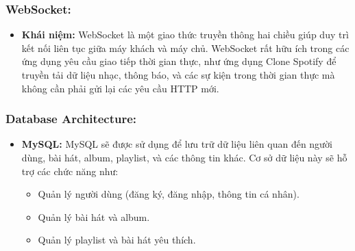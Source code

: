\subsubsection{WebSocket:}
\begin{itemize}
    \item \textbf{Khái niệm:} WebSocket là một giao thức truyền thông hai chiều giúp duy trì kết nối liên tục giữa máy khách và máy chủ. WebSocket rất hữu ích trong các ứng dụng yêu cầu giao tiếp thời gian thực, như ứng dụng Clone Spotify để truyền tải dữ liệu nhạc, thông báo, và các sự kiện trong thời gian thực mà không cần phải gửi lại các yêu cầu HTTP mới.
\end{itemize}

\subsubsection{Database Architecture:}
\begin{itemize}
    \item \textbf{MySQL:} MySQL sẽ được sử dụng để lưu trữ dữ liệu liên quan đến người dùng, bài hát, album, playlist, và các thông tin khác. Cơ sở dữ liệu này sẽ hỗ trợ các chức năng như:
    \begin{itemize}
        \item Quản lý người dùng (đăng ký, đăng nhập, thông tin cá nhân).
        \item Quản lý bài hát và album.
        \item Quản lý playlist và bài hát yêu thích.
    \end{itemize}
\end{itemize}